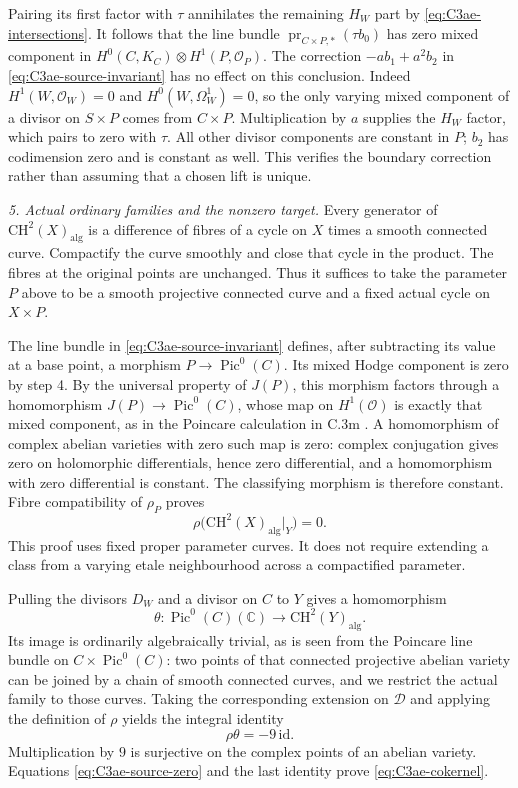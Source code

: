 Pairing its first factor with $\tau$ annihilates the
remaining $H_W$ part by \eqref{eq:C3ae-intersections}.
It follows that the line bundle
$\operatorname{pr}_{C\times P,*}(\tau b_0)$ has zero
mixed component in $H^0(C,K_C)\otimes H^1(P,\mathcal O_P)$.
The correction $-a b_1+a^2b_2$ in
\eqref{eq:C3ae-source-invariant} has no effect on this
conclusion. Indeed $H^1(W,\mathcal O_W)=0$ and
$H^0(W,\Omega_W^1)=0$, so the only varying mixed
component of a divisor on $S\times P$ comes from
$C\times P$. Multiplication by $a$ supplies the
$H_W$ factor, which pairs to zero with $\tau$.
All other divisor components are constant in $P$;
$b_2$ has codimension zero and is constant as well.
This verifies the boundary correction rather than
assuming that a chosen lift is unique.

\emph{5. Actual ordinary families and the nonzero target.}
Every generator of $\mathrm{CH}^2(X)_{\mathrm{alg}}$ is
a difference of fibres of a cycle on $X$ times a
smooth connected curve. Compactify the curve smoothly
and close that cycle in the product. The fibres at
the original points are unchanged. Thus it suffices
to take the parameter $P$ above to be a smooth
projective connected curve and a fixed actual cycle
on $X\times P$.

The line bundle in \eqref{eq:C3ae-source-invariant}
defines, after subtracting its value at a base point,
a morphism $P\to\operatorname{Pic}^0(C)$. Its mixed
Hodge component is zero by step 4. By the universal
property of $J(P)$, this morphism factors through a
homomorphism $J(P)\to\operatorname{Pic}^0(C)$, whose
map on $H^1(\mathcal O)$ is exactly that mixed
component, as in the Poincare calculation in C.3m
\citep[Theorem 1.2 and Lemma 9.5]{D_MilneJacobians2021}.
A homomorphism of complex abelian varieties
with zero such map is zero: complex conjugation gives
zero on holomorphic differentials, hence zero
differential, and a homomorphism with zero differential
is constant. The classifying morphism is therefore
constant. Fibre compatibility of $\rho_P$ proves
\begin{equation}\label{eq:C3ae-source-zero}
                \rho\bigl(\mathrm{CH}^2(X)_{\mathrm{alg}}|_Y\bigr)=0.
\end{equation}
This proof uses fixed proper parameter curves. It
does not require extending a class from a varying
etale neighbourhood across a compactified parameter.

Pulling the divisors $D_W$ and a divisor on $C$ to
$Y$ gives a homomorphism
\[
 \theta:\operatorname{Pic}^0(C)(\mathbb C)
               \longrightarrow \mathrm{CH}^2(Y)_{\mathrm{alg}}.
\]
Its image is ordinarily algebraically trivial,
as is seen from the Poincare line bundle on
$C\times\operatorname{Pic}^0(C)$: two points of that
connected projective abelian variety can be joined
by a chain of smooth connected curves, and we restrict
the actual family to those curves. Taking the corresponding
extension on $\mathcal D$ and applying the definition
of $\rho$ yields the integral identity
\[
                         \rho\theta=-9\,\mathrm{id}.
\]
Multiplication by $9$ is surjective on the complex
points of an abelian variety. Equations
\eqref{eq:C3ae-source-zero} and the last identity prove
\eqref{eq:C3ae-cokernel}.

